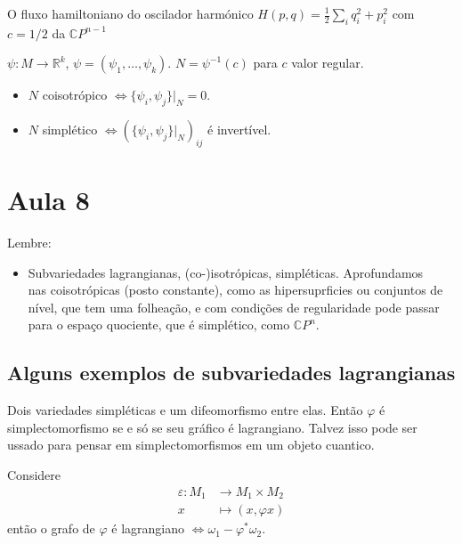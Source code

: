 \begin{example}
	O fluxo hamiltoniano do oscilador harm\'onico $H(p,q)=\frac{1}{2}\sum_{i}q_i^2+p_i^2$ com $c=1/2$ da  $\mathbb{C}P^{n-1}$
\end{example}

\begin{exercise}
	$\psi:M\to \mathbb{R}^{k}$, $\psi=(\psi_1,\ldots,\psi_k)$. $N=\psi^{-1}(c)$ para $c$ valor regular.
	\begin{itemize}
		\item $N$ coisotr\'opico $\iff \{\psi_i,\psi_j\}|_{N} =0$.

		\item $N$ simpl\'etico $\iff \left( \{\psi_i,\psi_j\} |_{N} \right)_{ij}$ \'e invert\'ivel.
	\end{itemize}
\end{exercise}

\section{Aula 8}

Lembre:

\begin{itemize}
	\item Subvariedades lagrangianas, (co-)isotr\'opicas, simpl\'eticas. Aprofundamos\\ nas coisotr\'opicas (posto constante), como as hipersuprficies ou conjuntos de n\'ivel, que tem uma folhea\c c\~ao, e com condi\c c\~oes  de regularidade pode passar para o espaço quociente, que \'e simpl\'etico, como $\mathbb{C}P^{n}$.
\end{itemize}

\subsection{Alguns exemplos de subvariedades lagrangianas}

\begin{example}
	Dois variedades simpl\'eticas e um difeomorfismo entre elas. Ent\~ao $\varphi$ \'e simplectomorfismo se e s\'o se seu gr\'afico \'e lagrangiano. Talvez isso pode ser ussado para pensar em simplectomorfismos em um objeto cuantico.
\end{example}

\begin{remark}
	Considere
	\begin{align*}
		\varepsilon: M_1 &\longrightarrow M_1\times M_2 \\
		x &\longmapsto (x,\varphi x)
	\end{align*}
	ent\~ao o grafo de $\varphi$ \'e lagrangiano $\iff \omega_1-\varphi^*\omega_2$.
\end{remark}

